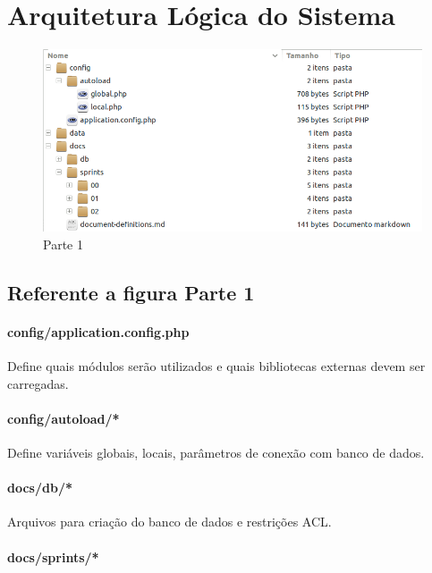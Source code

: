 \section{Arquitetura Lógica do Sistema}

\begin{figure}
    \includegraphics[scale=0.5]{img/arquitetura-pacotes-01.png}
    \caption{Parte 1}
\end{figure}

\subsection{Referente a figura Parte 1}

\paragraph{config/application.config.php}

Define quais módulos serão utilizados e quais bibliotecas externas devem
ser carregadas.

\paragraph{config/autoload/*}

Define variáveis globais, locais, parâmetros de conexão com banco de
dados.

\paragraph{docs/db/*}

Arquivos para criação do banco de dados e restrições ACL.

\paragraph{docs/sprints/*}

